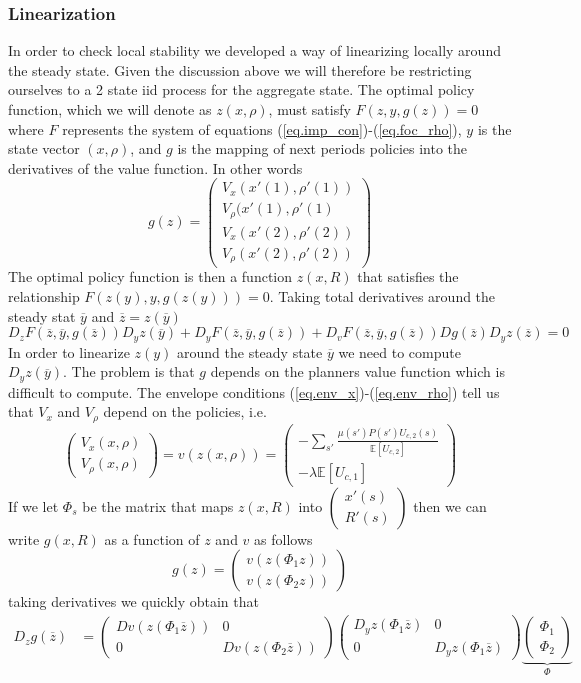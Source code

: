\documentclass[thmsb,11pt]{article}
\newcommand{\bmat}{\begin{matrix}}
\newcommand{\emat}{\end{matrix}}
\newcommand{\ov}{\overline}
\begin{document}
{\subsubsection{Linearization}  In order to check local stability we developed a way of linearizing locally around the steady state.  Given the discussion above we will therefore be restricting ourselves to a 2 state iid process for the aggregate state.  The optimal policy function, which we will denote as $z(x,\rho)$, must satisfy $F(z,y,g(z)) = 0$ where $F$ represents the system of equations (\ref{eq.imp_con})-(\ref{eq.foc_rho}), $y$ is the state vector $(x,\rho)$, and $g$ is the mapping of next periods policies into the derivatives of the value function.  In other words
\[
	g(z) = \left(\bmat V_x(x'(1),\rho'(1))\\ V_\rho(x'(1),\rho'(1)\\ V_x(x'(2),\rho'(2))\\ V_\rho(x'(2),\rho'(2))\emat\right)
\]The optimal policy function is then a function $z(x,R)$ that satisfies the relationship $F(z(y),y,g(z(y))) = 0$.  Taking total derivatives around the steady stat $\ov y$ and $\ov z = z(\ov y)$
\[
	D_zF(\ov z,\ov y, g(\ov z))D_yz(\ov y)+D_yF(\ov z, \ov y, g(\ov z)) + D_v F(\ov z, \ov y, g(\ov z)) D g(\ov z) D_y z(\ov z) = 0
\]  In order to linearize $z(y)$ around the steady state $\ov y$ we need to compute $D_y z(\ov y)$.  The problem is that $g$ depends on the planners value function which is difficult to compute.  The envelope conditions (\ref{eq.env_x})-(\ref{eq.env_rho}) tell us that $V_x$ and $V_\rho$ depend on the policies, i.e.
\[
	\left(\bmat V_x(x,\rho)\\ V_\rho(x,\rho)\emat\right) = v( z(x,\rho) ) =  \left(\bmat -\sum_{s'}\frac{\mu(s') P(s')U_{c,2}(s)}{\mathbb E\left[U_{c,2}\right]}\\ -\lambda \mathbb E\left[U_{c,1}\right]\emat\right)
\]  If we let $\Phi_s$ be the matrix that maps $z(x,R)$ into $\left(\bmat x'(s)\\ R'(s)\emat\right)$ then we can write $g(x,R)$ as a function of $z$ and $v$ as follows
\[
	g(z) = \left(\bmat v(z(\Phi_1 z))\\ v(z(\Phi_2 z))\emat\right)
\]taking derivatives we quickly obtain that
\begin{align*}
	D_z g(\ov z) &= \left(\bmat D v(z(\Phi_1 \ov z)) & 0 \\ 0&  D v(z(\Phi_2 \ov z))\emat\right)\left(\bmat D_y z(\Phi_1 \ov z) & 0\\ 0& D_y z(\Phi_1\ov z)\emat\right) \underbrace{\left(\bmat \Phi_1\\ \Phi_2\emat\right)}_{\Phi}\\

\end{align*}}
\end{document}
